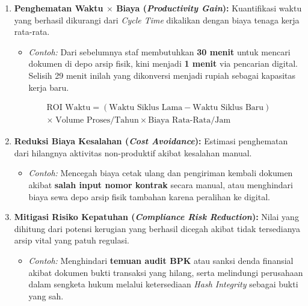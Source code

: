 \documentclass[12pt,a4paper]{report}
\begin{document}
\begin{enumerate}[leftmargin=*]
    \item \textbf{Penghematan Waktu $\times$ Biaya (\textit{Productivity Gain}):} Kuantifikasi waktu yang berhasil dikurangi dari \textit{Cycle Time} dikalikan dengan biaya tenaga kerja rata-rata. 
    \begin{itemize}[label=$\rightarrow$, nosep]
        \item \textit{Contoh:} Dari sebelumnya staf membutuhkan \textbf{30 menit} untuk mencari dokumen di depo arsip fisik, kini menjadi \textbf{1 menit} via pencarian digital. Selisih 29 menit inilah yang dikonversi menjadi rupiah sebagai kapasitas kerja baru.
    \end{itemize}
    \begin{multline*}
    \text{ROI Waktu} = (\text{Waktu Siklus Lama} - \text{Waktu Siklus Baru}) \\
    \times\; \text{Volume Proses/Tahun} \times \text{Biaya Rata-Rata/Jam}
    \end{multline*}
    \item \textbf{Reduksi Biaya Kesalahan (\textit{Cost Avoidance}):} Estimasi penghematan dari hilangnya aktivitas non-produktif akibat kesalahan manual.
    \begin{itemize}[label=$\rightarrow$, nosep]
        \item \textit{Contoh:} Mencegah biaya cetak ulang dan pengiriman kembali dokumen akibat \textbf{salah input nomor kontrak} secara manual, atau menghindari biaya sewa depo arsip fisik tambahan karena peralihan ke digital.
    \end{itemize}
    \item \textbf{Mitigasi Risiko Kepatuhan (\textit{Compliance Risk Reduction}):} Nilai yang dihitung dari potensi kerugian yang berhasil dicegah akibat tidak tersedianya arsip vital yang patuh regulasi.
    \begin{itemize}[label=$\rightarrow$, nosep]
        \item \textit{Contoh:} Menghindari \textbf{temuan audit BPK} atau sanksi denda finansial akibat dokumen bukti transaksi yang hilang, serta melindungi perusahaan dalam sengketa hukum melalui ketersediaan \textit{Hash Integrity} sebagai bukti yang sah.
    \end{itemize}
\end{enumerate}
\end{document}

